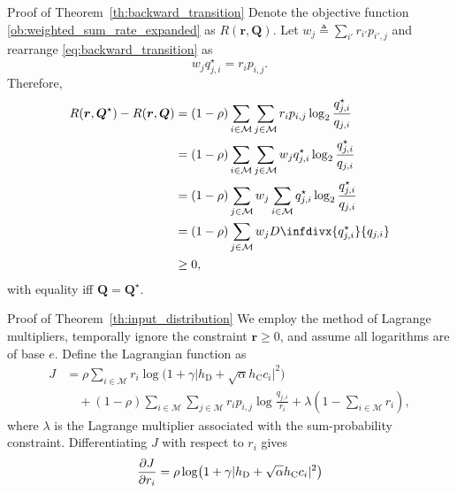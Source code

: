 \documentclass[journal]{IEEEtran}
\newcommand{\infdiv}{D\infdivx}
\begin{document}
	\begin{appendix}
		\begin{subsection}{Proof of Theorem~\ref{th:backward_transition}}
			Denote the objective function \eqref{ob:weighted_sum_rate_expanded} as $R(\boldsymbol{r}, \boldsymbol{Q})$. Let $w_j \triangleq \sum_{i'} r_{i'} p_{i', j}$ and rearrange \eqref{eq:backward_transition} as
			\begin{equation}
				w_j q_{j, i}^{\star} = r_i p_{i, j}.
			\end{equation}
			Therefore,
			\begin{align}
				R(\boldsymbol{r}, \boldsymbol{Q}^{\star}) - R(\boldsymbol{r}, \boldsymbol{Q})
				& = (1 - \rho) \sum_{i \in \mathcal{M}} \sum_{j \in \mathcal{M}} r_i p_{i, j} \log_2 \frac{q_{j, i}^{\star}}{q_{j, i}} \nonumber \\
				& = (1 - \rho) \sum_{i \in \mathcal{M}} \sum_{j \in \mathcal{M}} w_j q_{j, i}^{\star} \log_2 \frac{q_{j, i}^{\star}}{q_{j, i}} \nonumber \\
				& = (1 - \rho) \sum_{j \in \mathcal{M}} w_j \sum_{i \in \mathcal{M}} q_{j, i}^{\star} \log_2 \frac{q_{j, i}^{\star}}{q_{j, i}} \nonumber \\
				& = (1 - \rho) \sum_{j \in \mathcal{M}} w_j \infdiv{q_{j, i}^{\star}}{q_{j, i}} \nonumber \\
				& \ge 0,
			\end{align}
			with equality iff $\boldsymbol{Q} = \boldsymbol{Q}^{\star}$.
			\label{ap:backward_transition}
		\end{subsection}
		\begin{subsection}{Proof of Theorem~\ref{th:input_distribution}}
			We employ the method of Lagrange multipliers, temporally ignore the constraint $\boldsymbol{r} \ge 0$, and assume all logarithms are of base $e$. Define the Lagrangian function as
			\begin{align}
				J
				& = \rho \sum_{i \in \mathcal{M}} r_i \log \bigl( 1 + \gamma \lvert h_{\mathrm{D}} + \sqrt{\alpha} h_{\mathrm{C}} c_i \rvert^2 \bigr) \nonumber \\
				& \quad + (1 - \rho) \sum_{i \in \mathcal{M}} \sum_{j \in \mathcal{M}} r_i p_{i, j} \log \frac{q_{j, i}}{r_i} + \lambda \left( 1 - \sum_{i \in \mathcal{M}} r_i \right),
			\end{align}
			where $\lambda$ is the Lagrange multiplier associated with the sum-probability constraint. Differentiating $J$ with respect to $r_i$ gives
			\begin{align}
				\pdv{J}{r_i}
				& = \rho \log \bigl( 1 + \gamma \lvert h_{\mathrm{D}} + \sqrt{\alpha} h_{\mathrm{C}} c_i \rvert^2 \bigr) \\

\end{align}
\end{subsection}
\end{appendix}
\end{document}
